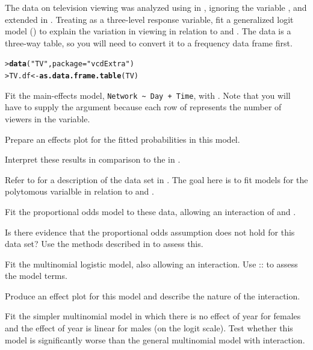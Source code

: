 \documentclass[11pt]{report}\usepackage[]{graphicx}\usepackage[]{color}
\makeatletter
\newcommand{\hlstr}[1]{\textcolor[rgb]{0.192,0.494,0.8}{#1}}%
\newcommand{\hlstd}[1]{\textcolor[rgb]{0.345,0.345,0.345}{#1}}%
\newcommand{\hlkwb}[1]{\textcolor[rgb]{0.69,0.353,0.396}{#1}}%
\newcommand{\hlkwc}[1]{\textcolor[rgb]{0.333,0.667,0.333}{#1}}%
\newcommand{\hlkwd}[1]{\textcolor[rgb]{0.737,0.353,0.396}{\textbf{#1}}}%
\newenvironment{kframe}{%
 \def\at@end@of@kframe{}%
 \ifinner\ifhmode%
  \def\at@end@of@kframe{\end{minipage}}%
  \begin{minipage}{\columnwidth}%
 \fi\fi%
 \def\FrameCommand##1{\hskip\@totalleftmargin \hskip-\fboxsep
 \colorbox{shadecolor}{##1}\hskip-\fboxsep
     \hskip-\linewidth \hskip-\@totalleftmargin \hskip\columnwidth}%
 \MakeFramed {\advance\hsize-\width
   \@totalleftmargin\z@ \linewidth\hsize
   \@setminipage}}%
 {\par\unskip\endMakeFramed%
 \at@end@of@kframe}
\newenvironment{knitrout}{}{} %
\renewenvironment{knitrout}{\small\renewcommand{\baselinestretch}{.85}}{} %
\makeatother
\begin{document}
\begin{Exercises}
\exercise The data  on television viewing was analyzed using \ca in , ignoring the variable
  , and extended in .  Treating  as a three-level response variable,
  fit a generalized logit model () to  explain the variation in viewing in relation to  and .
  The  data is a three-way table, so you will need to convert it to a frequency data frame first.
\begin{knitrout}
\color{fgcolor}\begin{kframe}
\begin{alltt}
\hlstd{> }\hlkwd{data}\hlstd{(}\hlstr{"TV"}\hlstd{,} \hlkwc{package}\hlstd{=}\hlstr{"vcdExtra"}\hlstd{)}
\hlstd{> }\hlstd{TV.df} \hlkwb{<-} \hlkwd{as.data.frame.table}\hlstd{(TV)}
\end{alltt}
\end{kframe}
\end{knitrout}
  \begin{enumerate*}
    \item Fit the main-effects model, \verb|Network ~ Day + Time|, with .  Note that you will have to
    supply the  argument because each row of  represents the number of viewers in the
     variable.
    \item Prepare an effects plot for the fitted probabilities in this model.
    \item Interpret these results in comparison to the \ca  in .
  \end{enumerate*}

\exercise\exhard\label{lab:logist-vietnam} Refer to  for a description of the  data set
  in . The goal here is to fit models for the polytomous  varialble in relation to 
  and .
  \begin{enumerate*}
    \item  Fit the proportional odds model to these data, allowing an interaction of  and .
    \item Is there evidence that the proportional odds assumption does not hold for this data set? Use the methods
    described in  to assess this.
    \item  Fit the multinomial logistic model, also allowing an interaction.  Use ::
    to assess the model terms.
    \item Produce an effect plot for this model and describe the nature of the interaction.
    \item Fit the simpler multinomial model in which there is no effect of year for females and the effect of
    year is linear for males (on the logit scale).  Test whether this model is significantly worse than the
    general multinomial model with interaction.
  \end{enumerate*}
  

\end{Exercises}
\end{document}
